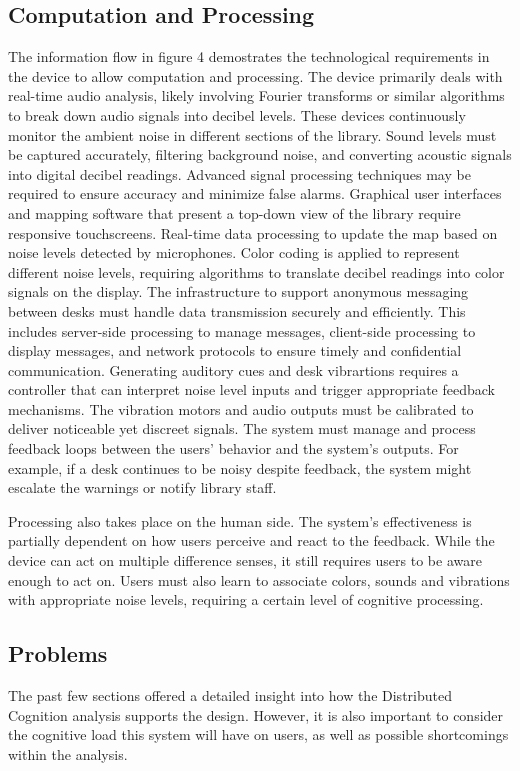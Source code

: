 \newpage
\subsection{Computation and Processing}
The information flow in figure 4 demostrates the technological requirements in the device to allow computation and processing. The device primarily deals with real-time audio analysis, likely involving Fourier transforms or similar algorithms to break down audio signals into decibel levels. These devices continuously monitor the ambient noise in different sections of the library. Sound levels must be captured accurately, filtering background noise, and converting acoustic signals into digital decibel readings. Advanced signal processing techniques may be required to ensure accuracy and minimize false alarms. Graphical user interfaces and mapping software that present a top-down view of the library require responsive touchscreens. Real-time data processing to update the map based on noise levels detected by microphones. Color coding is applied to represent different noise levels, requiring algorithms to translate decibel readings into color signals on the display. The infrastructure to support anonymous messaging between desks must handle data transmission securely and efficiently. This includes server-side processing to manage messages, client-side processing to display messages, and network protocols to ensure timely and confidential communication. Generating auditory cues and desk vibrartions requires a controller that can interpret noise level inputs and trigger appropriate feedback mechanisms. The vibration motors and audio outputs must be calibrated to deliver noticeable yet discreet signals. The system must manage and process feedback loops between the users' behavior and the system's outputs. For example, if a desk continues to be noisy despite feedback, the system might escalate the warnings or notify library staff.

Processing also takes place on the human side. The system's effectiveness is partially dependent on how users perceive and react to the feedback. While the device can act on multiple difference senses, it still requires users to be aware enough to act on. Users must also learn to associate colors, sounds and vibrations with appropriate noise levels, requiring a certain level of cognitive processing.

\subsection{Problems}
The past few sections offered a detailed insight into how the Distributed Cognition analysis supports the design. However, it is also important to consider the cognitive load this system will have on users, as well as possible shortcomings within the analysis.

